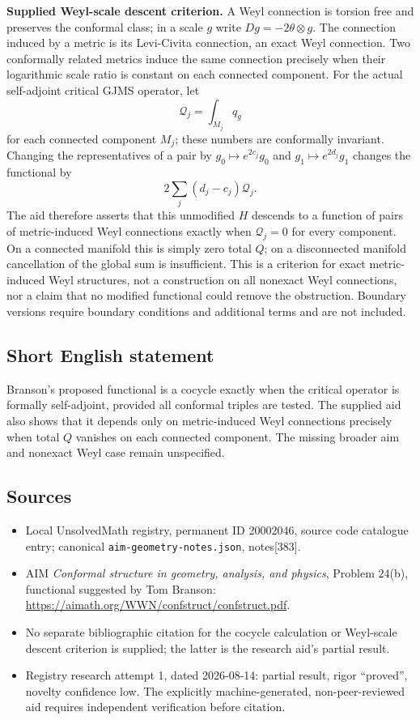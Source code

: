 \documentclass[11pt]{article}
\begin{document}
\textbf{Supplied Weyl-scale descent criterion.} A Weyl connection is torsion free and preserves the conformal class; in a scale $g$ write $Dg=-2\theta\otimes g$. The connection induced by a metric is its Levi-Civita connection, an exact Weyl connection. Two conformally related metrics induce the same connection precisely when their logarithmic scale ratio is constant on each connected component. For the actual self-adjoint critical GJMS operator, let
\[
 \mathcal Q_j=\int_{M_j}q_g
\]
for each connected component $M_j$; these numbers are conformally invariant. Changing the representatives of a pair by $g_0\mapsto e^{2c_j}g_0$ and $g_1\mapsto e^{2d_j}g_1$ changes the functional by
\[
 2\sum_j(d_j-c_j)\mathcal Q_j.
\]
The aid therefore asserts that this unmodified $H$ descends to a function of pairs of metric-induced Weyl connections exactly when $\mathcal Q_j=0$ for every component. On a connected manifold this is simply zero total $Q$; on a disconnected manifold cancellation of the global sum is insufficient. This is a criterion for exact metric-induced Weyl structures, not a construction on all nonexact Weyl connections, nor a claim that no modified functional could remove the obstruction. Boundary versions require boundary conditions and additional terms and are not included.
\subsection{Short English statement}
Branson's proposed functional is a cocycle exactly when the critical operator is formally self-adjoint, provided all conformal triples are tested. The supplied aid also shows that it depends only on metric-induced Weyl connections precisely when total $Q$ vanishes on each connected component. The missing broader aim and nonexact Weyl case remain unspecified.
\subsection{Sources}
\begin{itemize}
\item Local UnsolvedMath registry, permanent ID 20002046, source code catalogue entry; canonical \texttt{aim-geometry-notes.json}, notes[383].
\item AIM \emph{Conformal structure in geometry, analysis, and physics}, Problem 24(b), functional suggested by Tom Branson: \url{https://aimath.org/WWN/confstruct/confstruct.pdf}.
\item No separate bibliographic citation for the cocycle calculation or Weyl-scale descent criterion is supplied; the latter is the research aid's partial result.
\item Registry research attempt 1, dated 2026-08-14: partial result, rigor ``proved'', novelty confidence low. The explicitly machine-generated, non-peer-reviewed aid requires independent verification before citation.
\end{itemize}
\end{document}
